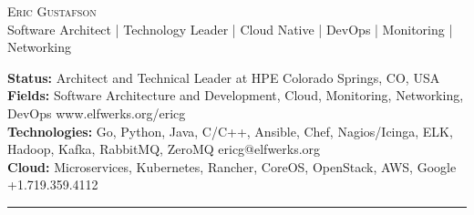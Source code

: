 \documentclass[10pt]{article}
\newcommand{\metasection}[2]
{
\footnotesize{#2} \hspace*{\fill} \footnotesize{#1}\\[1pt]
}
\begin{document}
\pagestyle{fancy}








\vspace{-8pt}
\begin{center}
	\HUGE \textsc{Eric Gustafson}
          \\[4pt]
	\small Software Architect | Technology Leader | Cloud Native | DevOps | Monitoring | Networking
\end{center}



\vspace{6pt}


\metasection{Colorado Springs, CO, USA}
            {\textbf{Status:} Architect and Technical Leader at HPE}
\metasection{www.elfwerks.org/ericg}
            {\textbf{Fields:} Software Architecture and Development,
              Cloud, Monitoring, Networking, DevOps}
\metasection{ericg@elfwerks.org}
            {\textbf{Technologies:} Go, Python, Java, C/C++, Ansible,
              Chef, Nagios/Icinga, ELK, Hadoop, Kafka, RabbitMQ, ZeroMQ}
\metasection{+1.719.359.4112}
            {\textbf{Cloud:} Microservices, Kubernetes, Rancher,
              CoreOS, OpenStack, AWS, Google}
\vspace{-2pt}
\textcolor{softcol}{\hrule}
\vspace{6pt}

\normalsize
\end{document}
